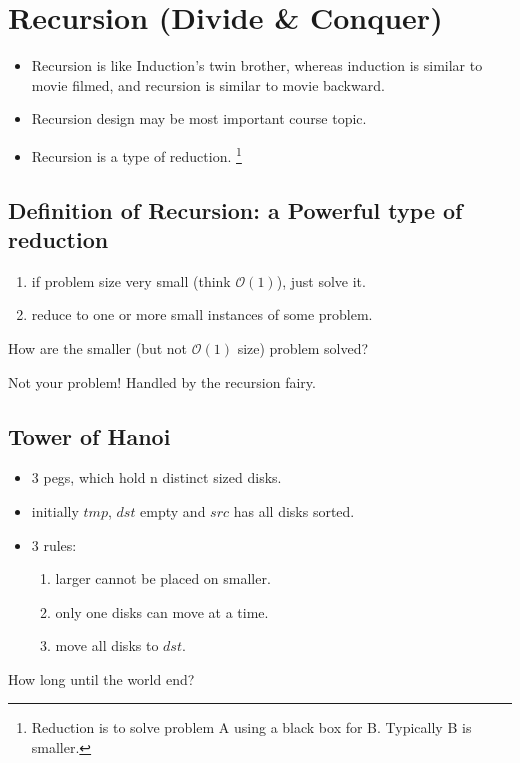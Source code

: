 \section{Recursion (Divide \& Conquer)}
\begin{itemize}
\item Recursion is like Induction's twin brother, whereas induction is similar to movie filmed, and recursion is similar to movie backward.
\item Recursion design may be most important course topic.
\item Recursion is a type of reduction. \footnote{Reduction is to solve problem A using a black box for B. Typically B is smaller.}
\end{itemize}

\subsection{Definition of Recursion: a Powerful type of reduction}
\begin{enumerate}
\item if problem size very small (think $\mathcal{O}(1)$), just solve it.
\item reduce to one or more small instances of some problem.
\end{enumerate}

\question How are the smaller (but not $\mathcal{O}(1)$ size) problem solved?

Not your problem! Handled by the recursion fairy.

\subsection{Tower of Hanoi}
\begin{itemize}
    \item 3 pegs, which hold n distinct sized disks.
    \item initially $tmp$, $dst$ empty and $src$ has all disks sorted.
    \item 3 rules:
    \begin{enumerate}
        \item larger cannot be placed on smaller.
        \item only one disks can move at a time.
        \item move all disks to $dst$.
    \end{enumerate}
\end{itemize}

\question How long until the world end?


